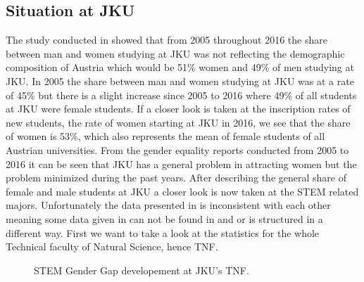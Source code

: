 \documentclass[12pt]{article}
\begin{document}
	\subsection{Situation at JKU}
The study conducted in  \cite{eq_1}\cite{eq_2}\cite{eq_3}  showed that from 2005 throughout 2016 the share between man and women studying at JKU was not reflecting the demographic composition of Austria which would be 51\% women and 49\% of men studying at JKU. In 2005  the share between man and women studying at JKU was at a rate of  45\% but there is a slight increase since 2005 to 2016 where 49\% of all students at JKU were female students. If a closer look is taken at the inscription rates of new students, the rate of women starting at JKU in 2016, we see that the share of women is 53\%, which also represents the mean of female students of all Austrian universities. From the gender equality reports conducted from 2005 to 2016 it can be seen that JKU has a general problem in attracting women but the problem minimized during the past years. \newline\newline
After describing the general share of female and male students at JKU a closer look is now taken at the STEM related majors.
Unfortunately the data presented in \cite{eq_1}\cite{eq_2}\cite{eq_3} is inconsistent with each other meaning some data given in \cite{eq_1}can not be found in \cite{eq_2} and \cite{eq_3} or is structured in a different way. First we want to take a look at the statistics for the whole Technical faculty of Natural Science, hence TNF.\newline
\begin{figure}[h!]
\centering
{}
\caption[Developement of STEM Gap at JKU]{STEM Gender Gap developement at JKU's TNF.}
\label{fig:dev}
\end{figure}
\end{document}
